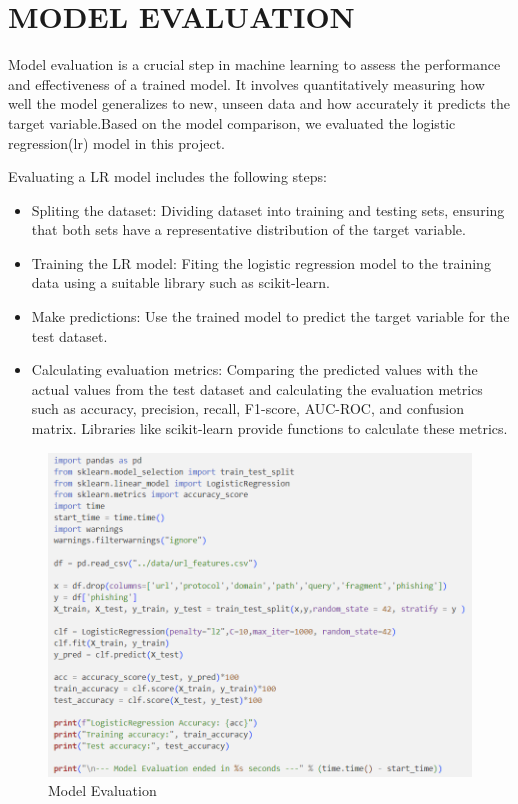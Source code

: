 \section{MODEL EVALUATION}
\par Model evaluation is a crucial step in machine learning to assess the performance and effectiveness of a trained model. It involves quantitatively measuring how well the model generalizes to new, unseen data and how accurately it predicts the target variable.Based on the model comparison, we evaluated the logistic regression(lr) model in this project.
\\
\par Evaluating a LR model includes the following steps:
\begin{itemize}
\item Spliting the dataset: Dividing dataset into training and testing sets, ensuring that both sets have a representative distribution of the target variable.
\item Training the LR model: Fiting the logistic regression model to the training data using a suitable library such as scikit-learn.
\item Make predictions: Use the trained model to predict the target variable for the test dataset.
\item Calculating evaluation metrics: Comparing the predicted values with the actual values from the test dataset and calculating the evaluation metrics such as accuracy, precision, recall, F1-score, AUC-ROC, and confusion matrix. Libraries like scikit-learn provide functions to calculate these metrics.
\end{itemize}

\begin{figure}[H]
\centerline{\includegraphics[scale=0.6]{modelEvaluation_Code.png}}
\caption{Model Evaluation}
\label{fig}
\end{figure}

